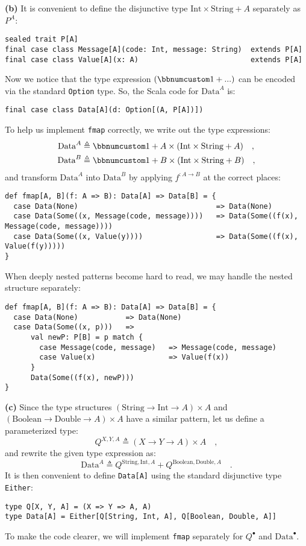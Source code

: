\textbf{(b)} It is convenient to define the disjunctive type $\text{Int}\times\text{String}+A$
separately as $P^{A}$:
\begin{lstlisting}
sealed trait P[A]
final case class Message[A](code: Int, message: String)  extends P[A]
final case class Value[A](x: A)                          extends P[A]
\end{lstlisting}
Now we notice that the type expression $\left(\bbnum 1+...\right)$
can be encoded via the standard \lstinline!Option! type. So, the
Scala code for $\text{Data}^{A}$ is:
\begin{lstlisting}
final case class Data[A](d: Option[(A, P[A])])
\end{lstlisting}
To help us implement \lstinline!fmap! correctly, we write out the
type expressions:
\begin{align*}
\text{Data}^{A} & \triangleq\bbnum 1+A\times(\text{Int}\times\text{String}+A)\quad,\\
\text{Data}^{B} & \triangleq\bbnum 1+B\times(\text{Int}\times\text{String}+B)\quad,
\end{align*}
and transform $\text{Data}^{A}$ into $\text{Data}^{B}$ by applying
$f^{:A\rightarrow B}$ at the correct places:
\begin{lstlisting}
def fmap[A, B](f: A => B): Data[A] => Data[B] = {
  case Data(None)                                => Data(None)
  case Data(Some((x, Message(code, message))))   => Data(Some((f(x), Message(code, message))))
  case Data(Some((x, Value(y))))                 => Data(Some((f(x), Value(f(y)))))
}
\end{lstlisting}
When deeply nested patterns become hard to read, we may handle the
nested structure separately:
\begin{lstlisting}
def fmap[A, B](f: A => B): Data[A] => Data[B] = {
  case Data(None)           => Data(None)
  case Data(Some((x, p)))   =>
      val newP: P[B] = p match {
        case Message(code, message)   => Message(code, message)
        case Value(x)                 => Value(f(x))
      }
      Data(Some((f(x), newP)))
}
\end{lstlisting}

\textbf{(c)} Since the type structures $(\text{String}\rightarrow\text{Int}\rightarrow A)\times A$
and $(\text{Boolean}\rightarrow\text{Double}\rightarrow A)\times A$
have a similar pattern, let us define a parameterized type:
\[
Q^{X,Y,A}\triangleq\left(X\rightarrow Y\rightarrow A\right)\times A\quad,
\]
and rewrite the given type expression as:
\[
\text{Data}^{A}\triangleq Q^{\text{String},\text{Int},A}+Q^{\text{Boolean},\text{Double},A}\quad.
\]
It is then convenient to define \lstinline!Data[A]! using the standard
disjunctive type \lstinline!Either!: 
\begin{lstlisting}
type Q[X, Y, A] = (X => Y => A, A)
type Data[A] = Either[Q[String, Int, A], Q[Boolean, Double, A]]
\end{lstlisting}
To make the code clearer, we will implement \lstinline!fmap! separately
for $Q^{\bullet}$ and $\text{Data}^{\bullet}$.


